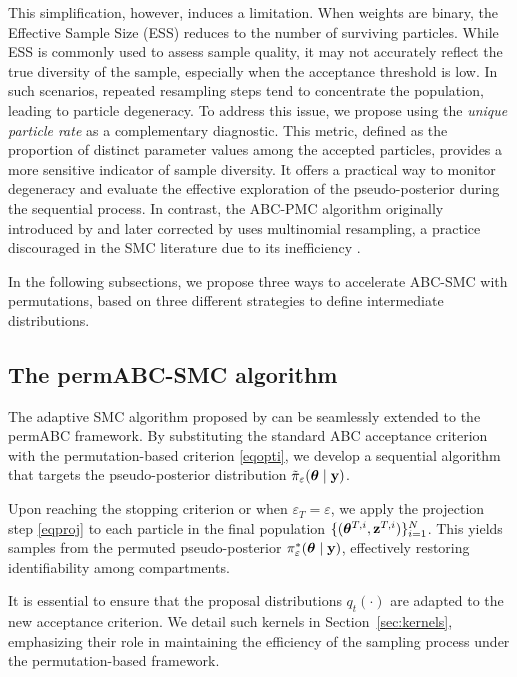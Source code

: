 This simplification, however, induces a limitation. When weights are binary, the Effective Sample Size (ESS) reduces to the number of surviving particles. While ESS is commonly used to assess sample quality, it may not accurately reflect the true diversity of the sample, especially when the acceptance threshold is low. In such scenarios, repeated resampling steps tend to concentrate the population, leading to particle degeneracy. 
To address this issue, we propose using the \emph{unique particle rate} as a complementary diagnostic. This metric, defined as the proportion of distinct parameter values among the accepted particles, provides a more sensitive indicator of sample diversity. It offers a practical way to monitor degeneracy and evaluate the effective exploration of the pseudo-posterior during the sequential process. 
In contrast, the ABC-PMC algorithm originally introduced by \citet{sissonCorrectionSissonSequential2009} and later corrected by \citet{beaumontAdaptiveApproximateBayesian2009b} uses multinomial resampling, a practice discouraged in the SMC literature due to its inefficiency \citep{chopin2020introduction}.

In the following subsections, we propose three ways to accelerate ABC-SMC with permutations, based on three different strategies to define intermediate distributions.

\subsection{The permABC-SMC algorithm}

The adaptive SMC algorithm proposed by \citet{delmoralAdaptiveSequentialMonte2012} can be seamlessly extended to the permABC framework. By substituting the standard ABC acceptance criterion with the permutation-based criterion \eqref{eqopti}, we develop a sequential algorithm that targets the pseudo-posterior distribution \( \tilde{\pi}_\varepsilon(\boldsymbol{\theta} \mid \mathbf{y}) \).

Upon reaching the stopping criterion or when \( \varepsilon_T = \varepsilon \), we apply the projection step \eqref{eqproj} to each particle in the final population \( \{(\boldsymbol{\theta}^{T,i}, \mathbf{z}^{T,i})\}_{i=1}^N \). This yields samples from the permuted pseudo-posterior \( \pi_\varepsilon^*(\boldsymbol{\theta} \mid \mathbf{y}) \), effectively restoring identifiability among compartments.

It is essential to ensure that the proposal distributions \( q_t(\cdot) \) are adapted to the new acceptance criterion. We detail such kernels in Section~\ref{sec:kernels}, emphasizing their role in maintaining the efficiency of the sampling process under the permutation-based framework.


